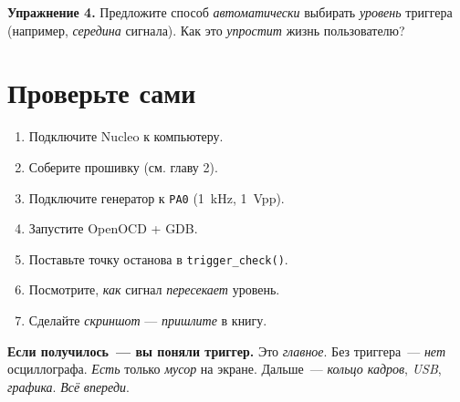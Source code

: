 \begin{exercisebox}
\textbf{Упражнение 4.} Предложите способ \emph{автоматически}
выбирать \emph{уровень} триггера (например, \emph{середина}
сигнала). Как это \emph{упростит} жизнь пользователю?
\end{exercisebox}

\section{Проверьте сами}
\label{sec:trigger-check}

\begin{enumerate}
    \item Подключите Nucleo к компьютеру.
    \item Соберите прошивку (см. главу 2).
    \item Подключите генератор к \texttt{PA0} (\SI{1}{\kilo\hertz},
          \SI{1}{\volt}pp).
    \item Запустите OpenOCD + GDB.
    \item Поставьте точку останова в \texttt{trigger\_check()}.
    \item Посмотрите, \emph{как} сигнал \emph{пересекает} уровень.
    \item Сделайте \emph{скриншот} — \emph{пришлите} в книгу.
\end{enumerate}

\begin{ideabox}
\textbf{Если получилось~--- вы поняли триггер.} Это
\emph{главное}. Без триггера~--- \emph{нет} осциллографа.
\emph{Есть} только \emph{мусор} на экране. Дальше~---
\emph{кольцо кадров}, \emph{USB}, \emph{графика}.
\emph{Всё} \emph{впереди}.
\end{ideabox}


